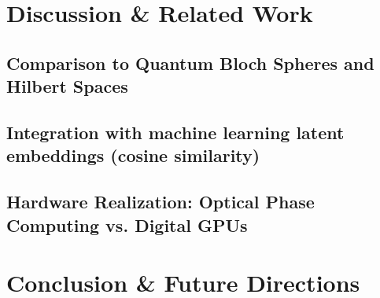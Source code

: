 \documentclass[12pt, a4paper]{article}
\begin{document}
\section{Discussion \& Related Work}
\subsection{Comparison to Quantum Bloch Spheres and Hilbert Spaces}
\subsection{Integration with machine learning latent embeddings (cosine similarity)}
\subsection{Hardware Realization: Optical Phase Computing vs. Digital GPUs}
\section{Conclusion \& Future Directions}
\end{document}
